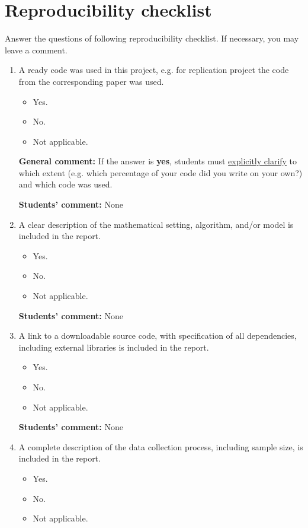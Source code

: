 \documentclass{article}
\begin{document}
\section{Reproducibility checklist}
\label{appendix-checklist}
Answer the questions of following reproducibility checklist. If necessary, you may leave a comment.
    \begin{enumerate}
    \item A ready code was used in this project, e.g. for replication project the code from the corresponding paper was used.
    \begin{itemize}
        \item [\faCheckSquareO] Yes.
        \item [\faSquareO] No.
        \item [\faSquareO] Not applicable.
    \end{itemize}
    
    \textbf{General comment:} If the answer is \textbf{yes}, students must \underline{explicitly clarify} to which extent (e.g. which percentage of your code did you write on your own?) and which code was used.
    
    \textbf{Students' comment:} None
    \item A clear description of the mathematical setting, algorithm, and/or model is included in the report.
    \begin{itemize}
        \item [\faSquareO] Yes.
        \item [\faSquareO] No.
        \item [\faSquareO] Not applicable.
    \end{itemize}
    
    \textbf{Students' comment:} None
    
    \item A link to a downloadable source code, with specification of all dependencies, including external libraries is included in the report.
    \begin{itemize}
        \item [\faSquareO] Yes.
        \item [\faSquareO] No.
        \item [\faSquareO] Not applicable.
    \end{itemize}
    
    \textbf{Students' comment:} None
    
    \item A complete description of the data collection process, including sample size, is included in the report.
    \begin{itemize}
        \item [\faSquareO] Yes.
        \item [\faSquareO] No.
        \item [\faSquareO] Not applicable.
    \end{itemize}
    

\end{enumerate}
\end{document}
